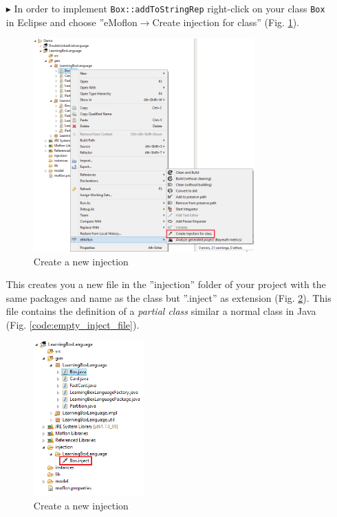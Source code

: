 \begin{enumerate}
    \item[$\blacktriangleright$] In order to implement \texttt{Box::addToStringRep} right-click on your class \texttt{Box} in Eclipse and choose ''eMoflon$\rightarrow$Create injection for class'' (Fig. \ref{fig:injection_create_injection}).

    \begin{figure}[htbp]
        \centering
        \includegraphics[width=0.8\textwidth]{pics/injectionBilder/create_injection_context_menu.png}
        \caption{Create a new injection}
        \label{fig:injection_create_injection}
    \end{figure}

    This creates you a new file in the ''injection'' folder of your project with the same packages and name as the class but ''.inject'' as extension (Fig. \ref{fig:injection_created_injection_file}). This file contains the definition of a \textit{partial class} similar a normal class in Java (Fig. \ref{code:empty_inject_file}). 

    \begin{figure}[htbp]
        \centering
        \includegraphics[width=0.4\textwidth]{pics/injectionBilder/newly_created_injection_file.png}
        \caption{Create a new injection}
        \label{fig:injection_created_injection_file}
    \end{figure}
    \FloatBarrier


\end{enumerate}
